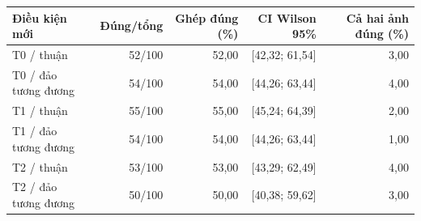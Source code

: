 \begin{tabular}{@{}lrrrr@{}}
\toprule
Điều kiện mới & Đúng/tổng & Ghép đúng (\%) & CI Wilson 95\% & Cả hai ảnh đúng (\%) \\
\midrule
T0 / thuận & 52/100 & 52,00 & [42,32; 61,54] & 3,00 \\
T0 / đảo tương đương & 54/100 & 54,00 & [44,26; 63,44] & 4,00 \\
T1 / thuận & 55/100 & 55,00 & [45,24; 64,39] & 2,00 \\
T1 / đảo tương đương & 54/100 & 54,00 & [44,26; 63,44] & 1,00 \\
T2 / thuận & 53/100 & 53,00 & [43,29; 62,49] & 4,00 \\
T2 / đảo tương đương & 50/100 & 50,00 & [40,38; 59,62] & 3,00 \\
\bottomrule
\end{tabular}
